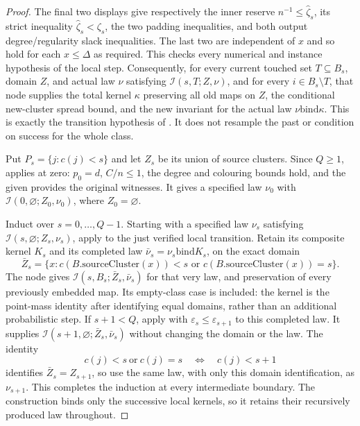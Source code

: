 \begin{proof}
The final two displays give respectively the inner reserve
$n^{-1}\leq\widehat\zeta_s$, its strict inequality
$\widehat\zeta_s<\zeta_s$, the two padding inequalities, and both
output degree/regularity slack inequalities. The last two are
independent of $x$ and so hold for each $x\leq\Delta$ as required.
This checks every numerical and instance hypothesis of the local step.
Consequently, for every current touched set $T\subseteq B_s$, domain
$Z$, and actual law $\nu$ satisfying $\mathcal I(s,T;Z,\nu)$, and for
every $i\in B_s\setminus T$, that node supplies the total kernel
$\kappa$ preserving all old maps on $Z$, the conditional new-cluster
spread bound, and the new invariant for the actual law
$\nu\mathbin{\mathrm{bind}}\kappa$. This is exactly the transition
hypothesis of . It does
not resample the past or condition on success for the whole class.

Put $P_s=\{j:c(j)<s\}$ and let $Z_s$ be its union of source clusters.
Since $Q\geq1$,  applies at zero:
$p_0=d$, $C/n\leq1$, the degree and colouring bounds hold, and the
given  provides the original witnesses.
It gives a specified law $\nu_0$ with
$\mathcal I(0,\varnothing;Z_0,\nu_0)$, where $Z_0=\varnothing$.

Induct over $s=0,\ldots,Q-1$. Starting with a specified law
$\nu_s$ satisfying $\mathcal I(s,\varnothing;Z_s,\nu_s)$, apply
 to the just verified local
transition. Retain its composite kernel $K_s$ and its completed law
$\bar\nu_s=\nu_s\mathbin{\mathrm{bind}}K_s$, on the exact domain
\[
 \bar Z_s=\{x:c(B.\mathrm{sourceCluster}(x))<s
                   \text{ or }c(B.\mathrm{sourceCluster}(x))=s\}.
\]
The node gives $\mathcal I(s,B_s;\bar Z_s,\bar\nu_s)$ for that very law,
and preservation of every previously embedded map. Its empty-class
case is included: the kernel is the point-mass identity after identifying
equal domains, rather than an additional probabilistic step.
If $s+1<Q$, apply  with
$\varepsilon_s\leq\varepsilon_{s+1}$ to this completed law.
It supplies $\mathcal I(s+1,\varnothing;\bar Z_s,\bar\nu_s)$ without
changing the domain or the law. The identity
\[
 c(j)<s\ \text{or}\ c(j)=s\quad\Longleftrightarrow\quad c(j)<s+1
\]
identifies $\bar Z_s=Z_{s+1}$, so use the same law, with only this
domain identification, as $\nu_{s+1}$. This completes the induction at
every intermediate boundary. The construction binds only the successive
local kernels, so it retains their recursively produced law throughout.


\end{proof}
